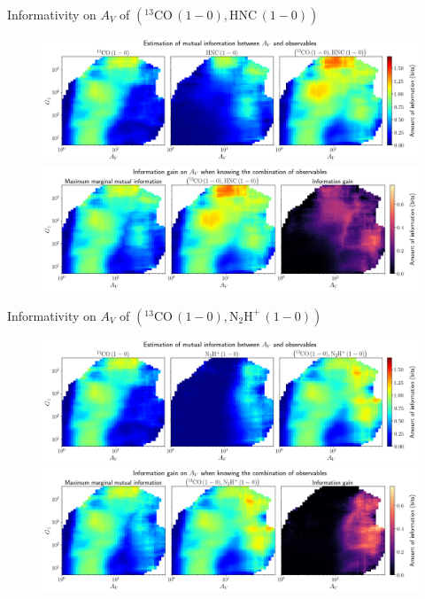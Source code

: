 \documentclass{beamer}
\begin{document}
\begin{frame}{Informativity on $A_V$ of $\left(\mathrm{^{13}CO\,(1-0)},\mathrm{HNC\,(1-0)}\right)$}
    \begin{figure}
        \centering
        \includegraphics[width=0.95\linewidth]{../mi/av__13co10_hnc10_mi.png}
        \vfill
        \includegraphics[width=0.95\linewidth]{../mi/av__13co10_hnc10_mi_gain.png}
    \end{figure}
\end{frame}

\begin{frame}{Informativity on $A_V$ of $\left(\mathrm{^{13}CO\,(1-0)},\mathrm{N_2H^+\,(1-0)}\right)$}
    \begin{figure}
        \centering
        \includegraphics[width=0.95\linewidth]{../mi/av__13co10_n2hp10_mi.png}
        \vfill
        \includegraphics[width=0.95\linewidth]{../mi/av__13co10_n2hp10_mi_gain.png}
    \end{figure}
\end{frame}
\end{document}
